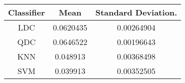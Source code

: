 \begin{tabular}{|c|c|c|}
 \hline 
Classifier & Mean & Standard Deviation. \\ 
 \hline 
LDC & 0.0620435 & 0.00264904 \\ 
 \hline 
QDC & 0.0646522 & 0.00196643 \\ 
 \hline 
KNN & 0.048913 & 0.00368498 \\ 
 \hline 
SVM & 0.039913 & 0.00352505 \\ 
 \hline 
\end{tabular}